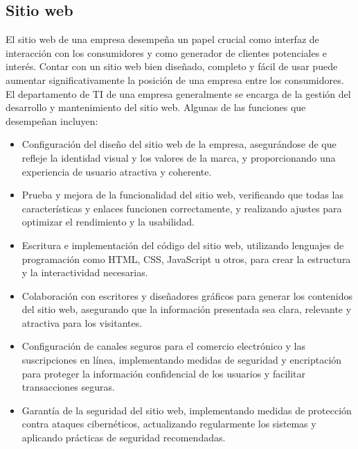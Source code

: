 \documentclass{article}
\begin{document}
\subsection{Sitio web}
El sitio web de una empresa desempeña un papel crucial como interfaz de interacción con los consumidores y como generador de clientes potenciales e interés. Contar con un sitio web bien diseñado, completo y fácil de usar puede aumentar significativamente la posición de una empresa entre los consumidores.
El departamento de TI de una empresa generalmente se encarga de la gestión del desarrollo y mantenimiento del sitio web. Algunas de las funciones que desempeñan incluyen:
\begin{itemize}[label=$\circ$]
    \item Configuración del diseño del sitio web de la empresa, asegurándose de que refleje la identidad visual y los valores de la marca, y proporcionando una experiencia de usuario atractiva y coherente.
    \item Prueba y mejora de la funcionalidad del sitio web, verificando que todas las características y enlaces funcionen correctamente, y realizando ajustes para optimizar el rendimiento y la usabilidad.
    \item Escritura e implementación del código del sitio web, utilizando lenguajes de programación como HTML, CSS, JavaScript u otros, para crear la estructura y la interactividad necesarias.
    \item Colaboración con escritores y diseñadores gráficos para generar los contenidos del sitio web, asegurando que la información presentada sea clara, relevante y atractiva para los visitantes.
    \item Configuración de canales seguros para el comercio electrónico y las suscripciones en línea, implementando medidas de seguridad y encriptación para proteger la información confidencial de los usuarios y facilitar transacciones seguras.
    \item Garantía de la seguridad del sitio web, implementando medidas de protección contra ataques cibernéticos, actualizando regularmente los sistemas y aplicando prácticas de seguridad recomendadas.
\end{itemize}
\end{document}
